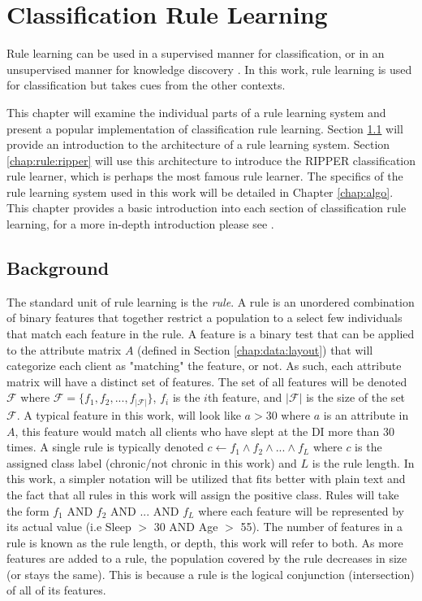 \chapter{Classification Rule Learning} \label{chap:rule}

Rule learning can be used in a supervised manner for classification, or in an unsupervised manner for knowledge discovery \cite{agrawal1996fast} \cite{kavvsek2006apriori}. In this work, rule learning is used for classification but takes cues from the other contexts.

This chapter will examine the individual parts of a rule learning system and present a popular implementation of classification rule learning. Section \ref{chap:rule:back} will provide an introduction to the architecture of a rule learning system.
Section \ref{chap:rule:ripper} will use this architecture to introduce the RIPPER classification rule learner, which is perhaps the most famous rule learner. 
The specifics of the rule learning system used in this work will be detailed in Chapter \ref{chap:algo}.
This chapter provides a basic introduction into each section of classification rule learning, for a more in-depth introduction please see \cite{furnkranz2012foundations}.


\section{Background} \label{chap:rule:back}

The standard unit of rule learning is the \emph{rule}. A rule is an unordered combination of binary features that together restrict a population to a select few individuals that match each feature in the rule. A feature is a binary test that can be applied to the attribute matrix $A$ (defined in Section \ref{chap:data:layout}) that will categorize each client as "matching" the feature, or not.
As such, each attribute matrix will have a distinct set of features.
The set of all features will be denoted $\mathcal{F}$ where $\mathcal{F} = \{ f_1, f_2, ..., f_{|\mathcal{F}|}\}$, $f_i$ is the $i$th feature, and $|\mathcal{F}|$ is the size of the set $\mathcal{F}$.
A typical feature in this work, will look like $a > 30$ where $a$ is an attribute in $A$, this feature would match all clients who have slept at the DI more than 30 times.
A single rule is typically denoted $c \leftarrow f_1 \land  f_2 \land ... \land f_L$ where $c$ is the assigned class label (chronic/not chronic in this work) and $L$ is the rule length. In this work, a simpler notation will be utilized that fits better with plain text and the fact that all rules in this work will assign the positive class. Rules will take the form $f_1$ AND $f_2$ AND $...$ AND $f_L$ where each feature will be represented by its actual value (i.e Sleep $>$ 30 AND Age $>$ 55).
The number of features in a rule is known as the rule length, or depth, this work will refer to both.
As more features are added to a rule, the population covered by the rule decreases in size (or stays the same). This is because a rule is the logical conjunction (intersection) of all of its features.

